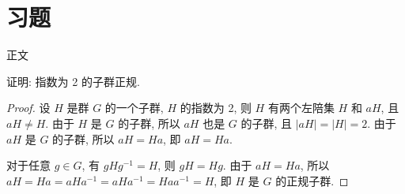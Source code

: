 
\section{习题}
    正文
    \begin{example}
        证明: 指数为 2 的子群正规.
    \end{example}
    \begin{proof}
        设 $H$ 是群 $G$ 的一个子群, $H$ 的指数为 2, 则 $H$ 有两个左陪集 $H$ 和 $aH$, 且 $aH \neq H$. 由于 $H$ 是 $G$ 的子群, 所以 $aH$ 也是 $G$ 的子群, 且 $|aH| = |H| = 2$. 由于 $aH$ 是 $G$ 的子群, 所以 $aH = Ha$, 即 $aH = Ha$.

        对于任意 $g \in G$, 有 $gHg^{-1} = H$, 则 $gH = Hg$. 由于 $aH = Ha$, 所以 $aH = Ha = aHa^{-1} = aHa^{-1} = Haa^{-1} = H$, 即 $H$ 是 $G$ 的正规子群.
    \end{proof}